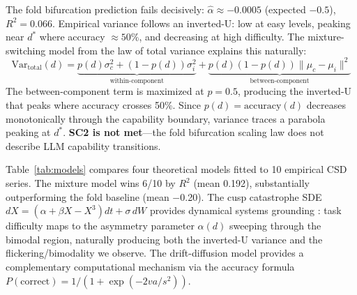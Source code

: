 \documentclass[11pt,letterpaper]{article}
\begin{document}
The fold bifurcation prediction fails decisively: $\hat{\alpha} \approx -0.0005$ (expected $-0.5$), $R^2 = 0.066$. Empirical variance follows an inverted-U: low at easy levels, peaking near $d^*$ where accuracy ${\approx}50\%$, and decreasing at high difficulty. The mixture-switching model from the law of total variance explains this naturally:
\begin{equation}
\text{Var}_{\text{total}}(d) = \underbrace{p(d)\sigma_c^2 + (1{-}p(d))\sigma_i^2}_{\text{within-component}} + \underbrace{p(d)(1{-}p(d))\|\mu_c - \mu_i\|^2}_{\text{between-component}}
\label{eq:mixture}
\end{equation}
The between-component term is maximized at $p{=}0.5$, producing the inverted-U that peaks where accuracy crosses 50\%. Since $p(d) = \text{accuracy}(d)$ decreases monotonically through the capability boundary, variance traces a parabola peaking at $d^*$. \textbf{SC2 is not met}---the fold bifurcation scaling law does not describe LLM capability transitions.

Table~\ref{tab:models} compares four theoretical models fitted to 10 empirical CSD series. The mixture model wins 6/10 by $R^2$ (mean 0.192), substantially outperforming the fold baseline (mean $-$0.20). The cusp catastrophe SDE $dX = (\alpha + \beta X - X^3)dt + \sigma\,dW$ provides dynamical systems grounding \cite{chen2022cusp}: task difficulty maps to the asymmetry parameter $\alpha(d)$ sweeping through the bimodal region, naturally producing both the inverted-U variance and the flickering/bimodality we observe. The drift-diffusion model \cite{ratcliff2008} provides a complementary computational mechanism via the accuracy formula $P(\text{correct}) = 1/(1 + \exp(-2va/s^2))$.
\end{document}
